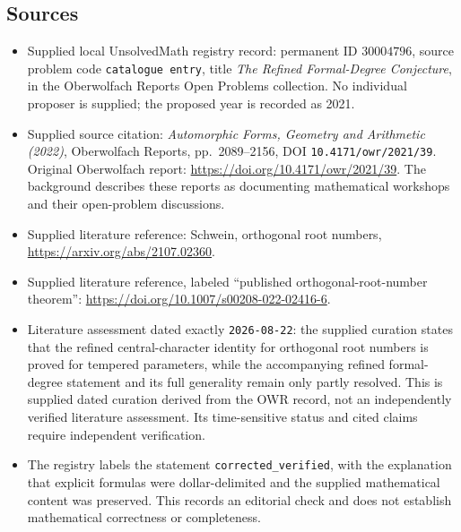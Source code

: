 \documentclass[11pt]{article}
\begin{document}
\subsection{Sources}
\begin{itemize}
\item Supplied local UnsolvedMath registry record: permanent ID \(30004796\), source problem code \texttt{catalogue entry}, title \emph{The Refined Formal-Degree Conjecture}, in the Oberwolfach Reports Open Problems collection. No individual proposer is supplied; the proposed year is recorded as 2021.
\item Supplied source citation: \emph{Automorphic Forms, Geometry and Arithmetic (2022)}, Oberwolfach Reports, pp.\ 2089--2156, DOI \texttt{10.4171/owr/2021/39}. Original Oberwolfach report: \url{https://doi.org/10.4171/owr/2021/39}. The background describes these reports as documenting mathematical workshops and their open-problem discussions.
\item Supplied literature reference: Schwein, orthogonal root numbers, \url{https://arxiv.org/abs/2107.02360}.
\item Supplied literature reference, labeled ``published orthogonal-root-number theorem'': \url{https://doi.org/10.1007/s00208-022-02416-6}.
\item Literature assessment dated exactly \texttt{2026-08-22}: the supplied curation states that the refined central-character identity for orthogonal root numbers is proved for tempered parameters, while the accompanying refined formal-degree statement and its full generality remain only partly resolved. This is supplied dated curation derived from the OWR record, not an independently verified literature assessment. Its time-sensitive status and cited claims require independent verification.
\item The registry labels the statement \texttt{corrected\_verified}, with the explanation that explicit formulas were dollar-delimited and the supplied mathematical content was preserved. This records an editorial check and does not establish mathematical correctness or completeness.
\end{itemize}
\end{document}
